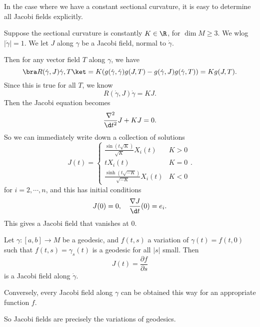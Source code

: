 \documentclass[a4paper]{article}
\begin{document}
In the case where we have a constant sectional curvature, it is easy to determine all Jacobi fields explicitly.

\begin{eg}
  Suppose the sectional curvature is constantly $K \in \R$, for $\dim M \geq 3$. We wlog $|\dot{\gamma}| = 1$. We let $J$ along $\gamma$ be a Jacobi field, normal to $\dot{\gamma}$.

  Then for any vector field $T$ along $\gamma$, we have
  \[
    \bra R(\dot{\gamma}, J) \dot{\gamma}, T\ket = K(g(\dot{\gamma}, \dot{\gamma}) g(J, T) - g(\dot{\gamma}, J) g(\dot{\gamma}, T)) = K g(J, T).
  \]
  Since this is true for all $T$, we know
  \[
    R(\dot{\gamma}, J) \dot{\gamma} = KJ.
  \]
  Then the Jacobi equation becomes
  \[
    \frac{\nabla^2}{\d t^2}J + KJ = 0.
  \]
  So we can immediately write down a collection of solutions
  \[
    J(t) =
    \begin{cases}
      \frac{\sin(t \sqrt{K})}{\sqrt{K}} X_i(t) & K > 0\\
      t X_i(t) & K = 0\\
      \frac{\sinh(t \sqrt{-K})}{\sqrt{-K}} X_i(t) & K < 0
    \end{cases}.
  \]
  for $i = 2, \cdots, n$, and this has initial conditions
  \[
    J(0) = 0,\quad \frac{\nabla J}{\d t}(0) = e_i.
  \]
  This gives a Jacobi field that vanishes at $0$.
\end{eg}

\begin{prop}
  Let $\gamma: [a, b] \to M$ be a geodesic, and $f(t, s)$ a variation of $\gamma(t) = f(t, 0)$ such that $f(t, s) = \gamma_s(t)$ is a geodesic for all $|s|$ small. Then
  \[
    J(t) = \frac{\partial f}{\partial s}
  \]
  is a Jacobi field along $\dot{\gamma}$.

  Conversely, every Jacobi field along $\gamma$ can be obtained this way for an appropriate function $f$.
\end{prop}
So Jacobi fields are precisely the variations of geodesics.
\end{document}
